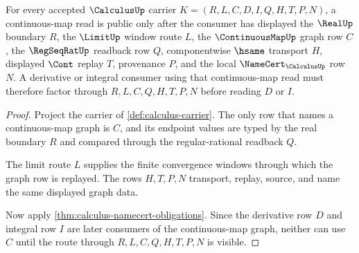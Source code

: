 \begin{theorem}
\label{thm:calculus-continuous-map-graph-replay-obligation}
For every accepted $\CalculusUp$ carrier $K=(R,L,C,D,I,Q,H,T,P,N)$, a continuous-map read is public only after the consumer has displayed the $\RealUp$ boundary $R$, the $\LimitUp$ window route $L$, the $\ContinuousMapUp$ graph row $C$, the $\RegSeqRatUp$ readback row $Q$, componentwise $\hsame$ transport $H$, displayed $\Cont$ replay $T$, provenance $P$, and the local $\NameCert_{\CalculusUp}$ row $N$. A derivative or integral consumer using that continuous-map read must therefore factor through $R,L,C,Q,H,T,P,N$ before reading $D$ or $I$.
\end{theorem}
\begin{proof}
Project the carrier of \autoref{def:calculus-carrier}. The only row that names a continuous-map graph is $C$, and its endpoint values are typed by the real boundary $R$ and compared through the regular-rational readback $Q$.

The limit route $L$ supplies the finite convergence windows through which the graph row is replayed. The rows $H,T,P,N$ transport, replay, source, and name the same displayed graph data.

Now apply \autoref{thm:calculus-namecert-obligations}. Since the derivative row $D$ and integral row $I$ are later consumers of the continuous-map graph, neither can use $C$ until the route through $R,L,C,Q,H,T,P,N$ is visible.
\end{proof}

